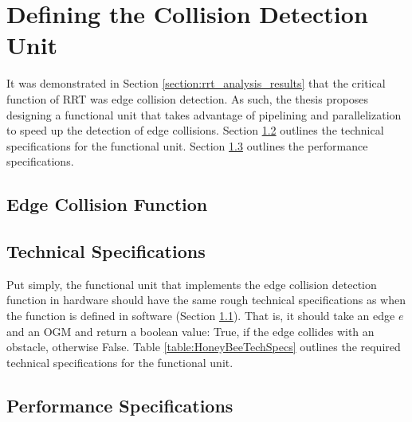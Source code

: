 
\section{Defining the Collision Detection Unit}

    It was demonstrated in Section \ref{section:rrt_analysis_results} that the critical function of \ac{RRT} was edge collision detection. As such, the thesis proposes designing a functional unit that takes advantage of pipelining and parallelization to speed up the detection of edge collisions. Section \ref{subsection:HoneyBeeTechSpechs} outlines the technical specifications for the functional unit. Section \ref{subsection:HoneyBeePerfSpechs} outlines the performance specifications.

    \subsection{Edge Collision Function}
    \label{subsection:EdgeCollisionFunction}
   
    \subsection{Technical Specifications}
    \label{subsection:HoneyBeeTechSpechs}
        Put simply, the functional unit that implements the edge collision detection function in hardware should have the same rough technical specifications as when the function is defined in software (Section \ref{subsection:EdgeCollisionFunction}). That is, it should take an edge $e$ and an \ac{OGM} and return a boolean value: True, if the edge collides with an obstacle, otherwise False.
        Table \ref{table:HoneyBeeTechSpecs} outlines the required technical specifications for the functional unit.
        

    \subsection{Performance Specifications}
    \label{subsection:HoneyBeePerfSpechs}

